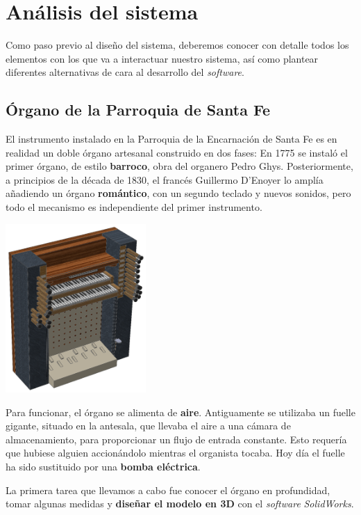 \documentclass[10pt,a4paper]{article}
\begin{document}
	
	\section{Análisis del sistema}

	Como paso previo al diseño del sistema, deberemos conocer con detalle todos
	los elementos con los que va a interactuar nuestro sistema, así como
	plantear diferentes alternativas de cara al desarrollo del
	\textit{software}.

	\subsection{Órgano de la Parroquia de Santa Fe}

	El instrumento instalado en la Parroquia de la Encarnación de Santa Fe es en
	realidad un doble órgano artesanal construido en dos fases: En 1775 se
	instaló el primer órgano, de estilo \textbf{barroco}, obra del organero
	Pedro Ghys. Posteriormente, a principios de la década de 1830, el francés
	Guillermo D'Enoyer lo amplía añadiendo un órgano \textbf{romántico}, con un
	segundo teclado y nuevos sonidos, pero todo el mecanismo es independiente
	del primer instrumento.
	
	\begin{multicols}{2}
		\noindent
		\begin{center}
			\includegraphics[width=0.4\textwidth]{images/organo} 
		\end{center}
		\columnbreak
		Para funcionar, el órgano se alimenta de \textbf{aire}. Antiguamente se utilizaba un fuelle gigante, situado en la antesala, que llevaba el aire a una cámara de almacenamiento, para proporcionar un flujo de entrada constante. Esto requería que hubiese alguien accionándolo mientras el organista tocaba. Hoy día el fuelle ha sido sustituido por una \textbf{bomba eléctrica}.
		
		La primera tarea que llevamos a cabo fue conocer el órgano en profundidad, tomar algunas medidas y \textbf{diseñar el modelo en 3D} con el \textit{software} \textit{SolidWorks}.
	\end{multicols}
	
\end{document}
